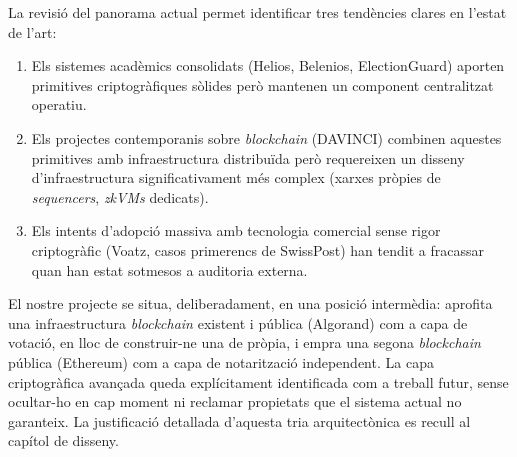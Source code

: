 La revisió del panorama actual permet identificar tres tendències
clares en l'estat de l'art:

\begin{enumerate}
    \item Els sistemes acadèmics consolidats (Helios, Belenios,
    ElectionGuard) aporten primitives criptogràfiques sòlides però
    mantenen un component centralitzat operatiu.

    \item Els projectes contemporanis sobre \emph{blockchain}
    (DAVINCI) combinen aquestes primitives amb infraestructura
    distribuïda però requereixen un disseny d'infraestructura
    significativament més complex (xarxes pròpies de \emph{sequencers},
    \emph{zkVMs} dedicats).

    \item Els intents d'adopció massiva amb tecnologia comercial
    sense rigor criptogràfic (Voatz, casos primerencs de SwissPost)
    han tendit a fracassar quan han estat sotmesos a auditoria
    externa.
\end{enumerate}

El nostre projecte se situa, deliberadament, en una posició
intermèdia: aprofita una infraestructura \emph{blockchain} existent i
pública (Algorand) com a capa de votació, en lloc de construir-ne
una de pròpia, i empra una segona \emph{blockchain} pública (Ethereum)
com a capa de notarització independent. La capa criptogràfica
avançada queda explícitament identificada com a treball futur, sense
ocultar-ho en cap moment ni reclamar propietats que el sistema actual
no garanteix. La justificació detallada d'aquesta tria
arquitectònica es recull al capítol de disseny.
